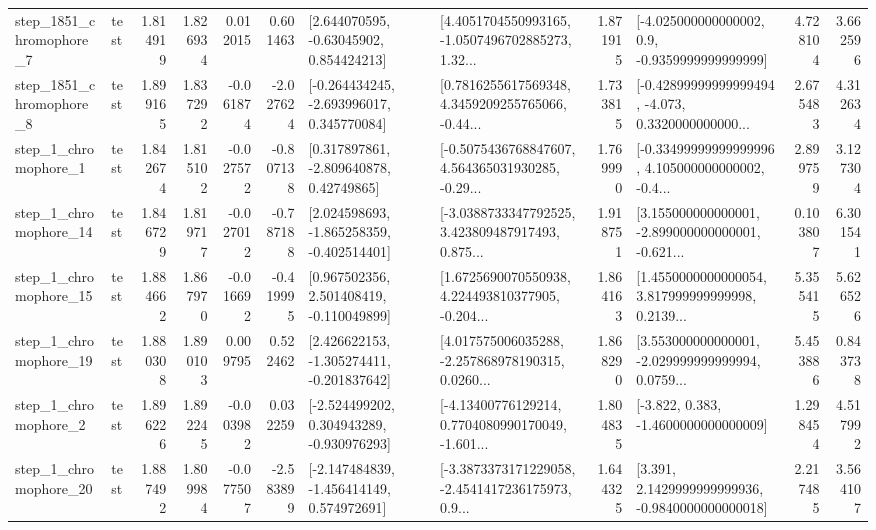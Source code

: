 \begin{tabular}{llrrrrllrlrr}
  step\_1851\_chromophore\_7 &      test &      1.814919 &    1.826934 &      0.012015 &  0.601463 &     [2.644070595, -0.63045902, 0.854424213] &  [4.4051704550993165, -1.0507496702885273, 1.32... &       1.871915 &     [-4.025000000000002, 0.9, -0.9359999999999999] &            4.728104 &          3.662596 \\
  step\_1851\_chromophore\_8 &      test &      1.899165 &    1.837292 &     -0.061874 & -2.027624 &   [-0.264434245, -2.693996017, 0.345770084] &  [0.7816255617569348, 4.3459209255765066, -0.44... &       1.733815 &  [-0.42899999999999494, -4.073, 0.3320000000000... &            2.675483 &          4.312634 \\
     step\_1\_chromophore\_1 &      test &      1.842674 &    1.815102 &     -0.027572 & -0.807138 &     [0.317897861, -2.809640878, 0.42749865] &  [-0.5075436768847607, 4.564365031930285, -0.29... &       1.769990 &  [-0.33499999999999996, 4.105000000000002, -0.4... &            2.899759 &          3.127304 \\
    step\_1\_chromophore\_14 &      test &      1.846729 &    1.819717 &     -0.027012 & -0.787188 &   [2.024598693, -1.865258359, -0.402514401] &  [-3.0388733347792525, 3.423809487917493, 0.875... &       1.918751 &  [3.155000000000001, -2.899000000000001, -0.621... &            0.103807 &          6.301541 \\
    step\_1\_chromophore\_15 &      test &      1.884662 &    1.867970 &     -0.016692 & -0.419995 &    [0.967502356, 2.501408419, -0.110049899] &  [1.6725690070550938, 4.224493810377905, -0.204... &       1.864163 &  [1.4550000000000054, 3.817999999999998, 0.2139... &            5.355415 &          5.626526 \\
    step\_1\_chromophore\_19 &      test &      1.880308 &    1.890103 &      0.009795 &  0.522462 &   [2.426622153, -1.305274411, -0.201837642] &  [4.017575006035288, -2.257868978190315, 0.0260... &       1.868290 &  [3.553000000000001, -2.029999999999994, 0.0759... &            5.453886 &          0.843738 \\
     step\_1\_chromophore\_2 &      test &      1.896226 &    1.892245 &     -0.003982 &  0.032259 &   [-2.524499202, 0.304943289, -0.930976293] &  [-4.13400776129214, 0.7704080990170049, -1.601... &       1.804835 &               [-3.822, 0.383, -1.4600000000000009] &            1.298454 &          4.517992 \\
    step\_1\_chromophore\_20 &      test &      1.887492 &    1.809984 &     -0.077507 & -2.583899 &   [-2.147484839, -1.456414149, 0.574972691] &  [-3.3873373171229058, -2.4541417236175973, 0.9... &       1.644325 &   [3.391, 2.1429999999999936, -0.9840000000000018] &            2.217485 &          3.564107 \\

\end{tabular}
